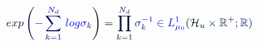 \documentclass[12pt]{article}
\begin{document}
\makeatletter
\renewcommand*{\@textcolor}[3]{%
  \protect\leavevmode
  \begingroup
    \color#1{#2}#3%
  \endgroup
}
\makeatother
\begin{displaymath}
\mathcolor[RGB]{0,0,15}{\operatorname*} { \mathcolor[RGB]{0,0,30}{e} \mathcolor[RGB]{0,0,45}{x} \mathcolor[RGB]{0,0,60}{p} } \mathcolor[RGB]{0,0,75}{\left(} \mathcolor[RGB]{0,0,90}{-} \mathcolor[RGB]{0,0,105}{\sum} _ { \mathcolor[RGB]{0,0,120}{k} \mathcolor[RGB]{0,0,135}{=} \mathcolor[RGB]{0,0,150}{1} } ^ { \mathcolor[RGB]{0,0,165}{N} _ { \mathcolor[RGB]{0,0,180}{d} } } \mathcolor[RGB]{0,0,195}{\operatorname*} { \mathcolor[RGB]{0,0,210}{l} \mathcolor[RGB]{0,0,225}{o} \mathcolor[RGB]{0,0,240}{g} } \mathcolor[RGB]{0,0,255}{\sigma} _ { \mathcolor[RGB]{0,15,0}{k} } \mathcolor[RGB]{0,15,15}{\right)} \mathcolor[RGB]{0,15,30}{=} \mathcolor[RGB]{0,15,45}{\prod} _ { \mathcolor[RGB]{0,15,60}{k} \mathcolor[RGB]{0,15,75}{=} \mathcolor[RGB]{0,15,90}{1} } ^ { \mathcolor[RGB]{0,15,105}{N} _ { \mathcolor[RGB]{0,15,120}{d} } } \mathcolor[RGB]{0,15,135}{\sigma} _ { \mathcolor[RGB]{0,15,150}{k} } ^ { \mathcolor[RGB]{0,15,165}{-} \mathcolor[RGB]{0,15,180}{1} } \mathcolor[RGB]{0,15,195}{\in} \mathcolor[RGB]{0,15,210}{L} _ { \mathcolor[RGB]{0,15,225}{\mu} _ { \mathcolor[RGB]{0,15,240}{0} } } ^ { \mathcolor[RGB]{0,15,255}{1} } \mathcolor[RGB]{0,30,0}{(} \mathcal { \mathcolor[RGB]{0,30,15}{H} } _ { \mathcolor[RGB]{0,30,30}{u} } \mathcolor[RGB]{0,30,45}{\times} \mathbb { \mathcolor[RGB]{0,30,60}{R} } ^ { \mathcolor[RGB]{0,30,75}{+} } \mathcolor[RGB]{0,30,90}{;} \mathbb { \mathcolor[RGB]{0,30,105}{R} } \mathcolor[RGB]{0,30,120}{)}
\end{displaymath}
\end{document}

